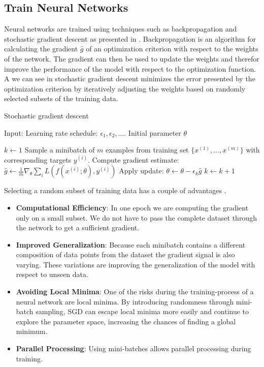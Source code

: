 \subsection{Train Neural Networks}

Neural networks are trained using techniques such as backpropagation \cite{DL_Backpropagation} and stochastic gradient descent \cite{SGD} \cite{SGD2} as presented in . Backpropagation is an algorithm for calculating the gradient $\hat{g}$ of an optimization criterion with respect to the weights of the network. The gradient can then be used to update the weights and therefor improve the performance of the model with respect to the optimization function. A we can see in  stochastic gradient descent minimizes the error presented by the optimization criterion by iteratively adjusting the weights based on randomly selected subsets of the training data. 

\begin{algorithm}
    \caption{Stochastic gradient descent}\label{alg:SGD}
    \begin{algorithmic}
        \State{} Input: Learning rate schedule: $\epsilon_1, \epsilon_2, \ldots$. Initial parameter $\theta$

        \State{} $k \leftarrow 1$
            \State{} Sample a minibatch of $m$ examples from training set $\{x^{(1)}, \ldots, x^{(m)}\}$ with corresponding targets $y^{(i)}$.
            \State{} Compute gradient estimate:
            \State{} $\hat{g} \leftarrow \frac{1}{m}\nabla_\theta \sum_i L(f(x^{(i)}; \theta), y^{(i)})$
            \State{} Apply update:
            \State{} $\theta \leftarrow \theta - \epsilon_k \hat{g}$
            \State{} $k \leftarrow k + 1$
        \EndWhile{}
\end{algorithmic}
\end{algorithm} 

Selecting a random subset of training data has a couple of advantages \cite{SAG_overview}. 
\begin{itemize}
	\item \textbf{Computational Efficiency}: In one epoch we are computing the gradient only on a small subset. We do not have to pass the complete dataset through the network to get a sufficient gradient.
	\item \textbf{Improved Generalization}: Because each minibatch contains a different composition of data points from the dataset the gradient signal is also varying. These variations are improving the generalization of the model with respect to unseen data.
	\item \textbf{Avoiding Local Minima}: One of the risks during the training-process of a neural network are local minima. By introducing randomness through mini-batch sampling, SGD can escape local minima more easily and continue to explore the parameter space, increasing the chances of finding a global minimum.
	\item \textbf{Parallel Processing}: Using mini-batches allows parallel processing during training. 
\end{itemize}

